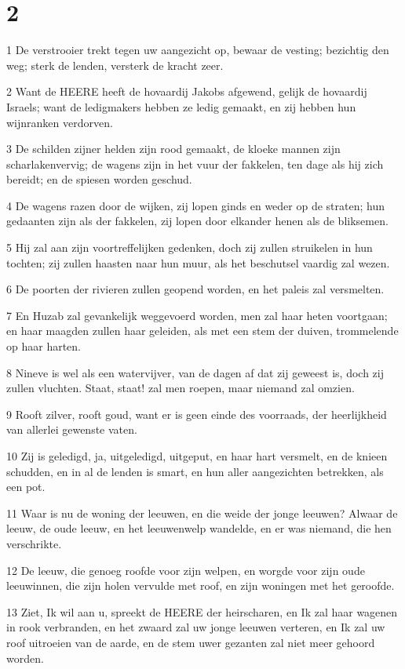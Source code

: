 \chapter{2}

\par 1 De verstrooier trekt tegen uw aangezicht op, bewaar de vesting; bezichtig den weg; sterk de lenden, versterk de kracht zeer.
\par 2 Want de HEERE heeft de hovaardij Jakobs afgewend, gelijk de hovaardij Israels; want de ledigmakers hebben ze ledig gemaakt, en zij hebben hun wijnranken verdorven.
\par 3 De schilden zijner helden zijn rood gemaakt, de kloeke mannen zijn scharlakenvervig; de wagens zijn in het vuur der fakkelen, ten dage als hij zich bereidt; en de spiesen worden geschud.
\par 4 De wagens razen door de wijken, zij lopen ginds en weder op de straten; hun gedaanten zijn als der fakkelen, zij lopen door elkander henen als de bliksemen.
\par 5 Hij zal aan zijn voortreffelijken gedenken, doch zij zullen struikelen in hun tochten; zij zullen haasten naar hun muur, als het beschutsel vaardig zal wezen.
\par 6 De poorten der rivieren zullen geopend worden, en het paleis zal versmelten.
\par 7 En Huzab zal gevankelijk weggevoerd worden, men zal haar heten voortgaan; en haar maagden zullen haar geleiden, als met een stem der duiven, trommelende op haar harten.
\par 8 Nineve is wel als een watervijver, van de dagen af dat zij geweest is, doch zij zullen vluchten. Staat, staat! zal men roepen, maar niemand zal omzien.
\par 9 Rooft zilver, rooft goud, want er is geen einde des voorraads, der heerlijkheid van allerlei gewenste vaten.
\par 10 Zij is geledigd, ja, uitgeledigd, uitgeput, en haar hart versmelt, en de knieen schudden, en in al de lenden is smart, en hun aller aangezichten betrekken, als een pot.
\par 11 Waar is nu de woning der leeuwen, en die weide der jonge leeuwen? Alwaar de leeuw, de oude leeuw, en het leeuwenwelp wandelde, en er was niemand, die hen verschrikte.
\par 12 De leeuw, die genoeg roofde voor zijn welpen, en worgde voor zijn oude leeuwinnen, die zijn holen vervulde met roof, en zijn woningen met het geroofde.
\par 13 Ziet, Ik wil aan u, spreekt de HEERE der heirscharen, en Ik zal haar wagenen in rook verbranden, en het zwaard zal uw jonge leeuwen verteren, en Ik zal uw roof uitroeien van de aarde, en de stem uwer gezanten zal niet meer gehoord worden.

